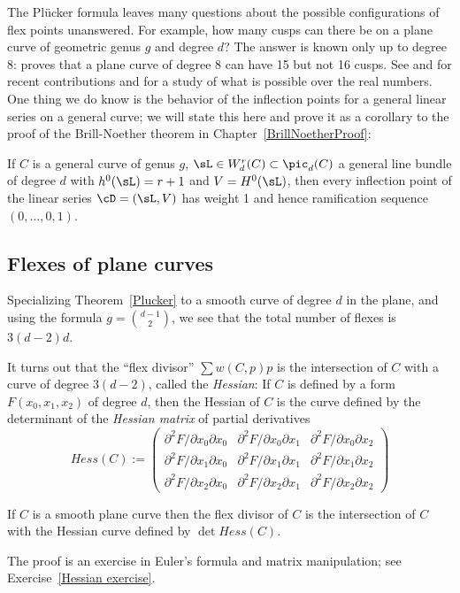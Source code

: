 The Pl\"ucker formula leaves many questions about the possible configurations of flex points unanswered. 
For example, how many cusps can there be on a plane curve of geometric genus $g$ and degree $d$? 
The answer is known only up to degree 8: \cite{Zariski1931} proves that a plane curve of degree 8 can have 15 but not 16 cusps.
See \cite{Calabri} and \cite{Kulikov} for recent contributions and \cite{Kharlamov-Sottile} for a study of what is possible
over the real numbers.
One thing we do know is the behavior of the inflection points for a general linear series on a general curve; we will state this here and prove it as a corollary to the proof of the Brill-Noether theorem in Chapter~\ref{BrillNoetherProof}:

\begin{theorem}\label{Brill Noether Plucker}
If $C$ is a general curve of genus $g$, $\sL \in W^r_d(C) \subset \pic_d(C)$ a general line bundle of degree $d$ with $h^0(\sL) = r+1$ and $V = H^0(\sL)$, then every inflection point of the linear series $\cD = (\sL, V)$ has weight 1 and hence ramification sequence $(0, \dots, 0, 1)$.
\end{theorem}


\subsection{Flexes of plane curves}\label{plane curve pluecker}

Specializing Theorem~\ref{Plucker} to a smooth curve of degree $d$ in the plane, and using the formula
$g= {d-1\choose 2}$, we see that the total number of flexes is $3(d-2)d$. 

It turns out that the ``flex divisor''
$\sum w(C, p)p$
is the intersection of $C$ with a curve of degree $3(d-2)$, called the \emph{Hessian}: If $C$ is defined by a form $F(x_0, x_1, x_2)$ of degree $d$, then
the Hessian of $C$ is the curve defined by the determinant of the \emph{Hessian matrix} of partial derivatives
$$
Hess(C) :=
\begin{pmatrix}
 \partial^2 F/\partial x_0 \partial x_0 & \partial^2 F/\partial x_0 \partial x_1 & \partial^2 F/\partial x_0 \partial x_2 \\
\partial^2 F/\partial x_1 \partial x_0 & \partial^2 F/\partial x_1 \partial x_1 & \partial^2 F/\partial x_1 \partial x_2 \\
\partial^2 F/\partial x_2 \partial x_0 & \partial^2 F/\partial x_2 \partial x_1 & \partial^2 F/\partial x_2 \partial x_2 
\end{pmatrix}
$$
\begin{theorem}\label{Hessian} If $C$ is a smooth plane curve then the flex divisor of $C$ is the intersection 
of $C$ with the Hessian curve defined by $\det Hess(C)$.
\end{theorem}
The proof is an exercise in Euler's formula and matrix manipulation; see Exercise~\ref{Hessian exercise}.

